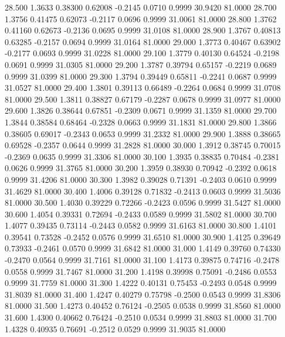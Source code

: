   28.500   1.3633   0.38300   0.62008  -0.2145   0.0710   0.9999  30.9420  81.0000
  28.700   1.3756   0.41475   0.62073  -0.2117   0.0696   0.9999  31.0061  81.0000
  28.800   1.3762   0.41160   0.62673  -0.2136   0.0695   0.9999  31.0108  81.0000
  28.900   1.3767   0.40813   0.63285  -0.2157   0.0694   0.9999  31.0164  81.0000
  29.000   1.3773   0.40467   0.63902  -0.2177   0.0693   0.9999  31.0228  81.0000
  29.100   1.3779   0.40130   0.64524  -0.2198   0.0691   0.9999  31.0305  81.0000
  29.200   1.3787   0.39794   0.65157  -0.2219   0.0689   0.9999  31.0399  81.0000
  29.300   1.3794   0.39449   0.65811  -0.2241   0.0687   0.9999  31.0527  81.0000
  29.400   1.3801   0.39113   0.66489  -0.2264   0.0684   0.9999  31.0708  81.0000
  29.500   1.3811   0.38827   0.67179  -0.2287   0.0678   0.9999  31.0977  81.0000
  29.600   1.3826   0.38644   0.67851  -0.2309   0.0671   0.9999  31.1359  81.0000
  29.700   1.3844   0.38584   0.68464  -0.2328   0.0663   0.9999  31.1831  81.0000
  29.800   1.3866   0.38605   0.69017  -0.2343   0.0653   0.9999  31.2332  81.0000
  29.900   1.3888   0.38665   0.69528  -0.2357   0.0644   0.9999  31.2828  81.0000
  30.000   1.3912   0.38745   0.70015  -0.2369   0.0635   0.9999  31.3306  81.0000
  30.100   1.3935   0.38835   0.70484  -0.2381   0.0626   0.9999  31.3765  81.0000
  30.200   1.3959   0.38930   0.70942  -0.2392   0.0618   0.9999  31.4206  81.0000
  30.300   1.3982   0.39028   0.71391  -0.2403   0.0610   0.9999  31.4629  81.0000
  30.400   1.4006   0.39128   0.71832  -0.2413   0.0603   0.9999  31.5036  81.0000
  30.500   1.4030   0.39229   0.72266  -0.2423   0.0596   0.9999  31.5427  81.0000
  30.600   1.4054   0.39331   0.72694  -0.2433   0.0589   0.9999  31.5802  81.0000
  30.700   1.4077   0.39435   0.73114  -0.2443   0.0582   0.9999  31.6163  81.0000
  30.800   1.4101   0.39541   0.73528  -0.2452   0.0576   0.9999  31.6510  81.0000
  30.900   1.4125   0.39649   0.73933  -0.2461   0.0570   0.9999  31.6842  81.0000
  31.000   1.4149   0.39760   0.74330  -0.2470   0.0564   0.9999  31.7161  81.0000
  31.100   1.4173   0.39875   0.74716  -0.2478   0.0558   0.9999  31.7467  81.0000
  31.200   1.4198   0.39998   0.75091  -0.2486   0.0553   0.9999  31.7759  81.0000
  31.300   1.4222   0.40131   0.75453  -0.2493   0.0548   0.9999  31.8039  81.0000
  31.400   1.4247   0.40279   0.75798  -0.2500   0.0543   0.9999  31.8306  81.0000
  31.500   1.4273   0.40452   0.76124  -0.2505   0.0538   0.9999  31.8560  81.0000
  31.600   1.4300   0.40662   0.76424  -0.2510   0.0534   0.9999  31.8803  81.0000
  31.700   1.4328   0.40935   0.76691  -0.2512   0.0529   0.9999  31.9035  81.0000
